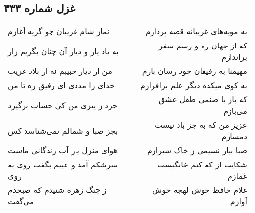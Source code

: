 \begin{center}
\section*{غزل شماره ۳۳۳}
\label{sec:sh333}
\begin{longtable}{l p{0.5cm} r}
نماز شام غریبان چو گریه آغازم
&&
به مویه‌های غریبانه قصه پردازم
\\
به یاد یار و دیار آن چنان بگریم زار
&&
که از جهان ره و رسم سفر براندازم
\\
من از دیار حبیبم نه از بلاد غریب
&&
مهیمنا به رفیقان خود رسان بازم
\\
خدای را مددی ای رفیق ره تا من
&&
به کوی میکده دیگر علم برافرازم
\\
خرد ز پیری من کی حساب برگیرد
&&
که باز با صنمی طفل عشق می‌بازم
\\
بجز صبا و شمالم نمی‌شناسد کس
&&
عزیز من که به جز باد نیست دمسازم
\\
هوای منزل یار آب زندگانی ماست
&&
صبا بیار نسیمی ز خاک شیرازم
\\
سرشکم آمد و عیبم بگفت روی به روی
&&
شکایت از که کنم خانگیست غمازم
\\
ز چنگ زهره شنیدم که صبحدم می‌گفت
&&
غلام حافظ خوش لهجه خوش آوازم
\\
\end{longtable}
\end{center}
